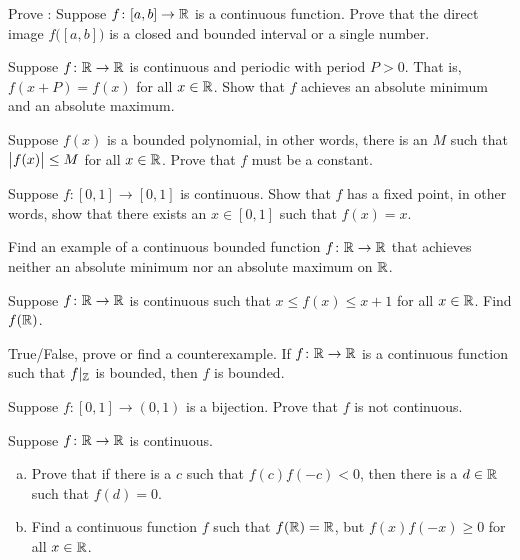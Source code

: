 \begin{exercise}
Prove :
Suppose $f \colon [a,b] \to {\mathbb{R}}$ is a continuous function.  Prove
that the direct image $f\bigl([a,b]\bigr)$ is a closed and bounded interval or
a single number.
\end{exercise}

\begin{exercise}
Suppose $f \colon {\mathbb{R}} \to {\mathbb{R}}$ is continuous and periodic with period
$P > 0$.  That is, $f(x+P) = f(x)$ for all $x \in {\mathbb{R}}$.  Show that $f$
achieves an absolute minimum and an absolute maximum.
\end{exercise}

\begin{exercise}[Challenging]
Suppose $f(x)$ is a bounded polynomial,
in other words, there is an $M$ such that $\bigl\lvert {f(x)} \bigr\rvert \leq M$
for all $x \in {\mathbb{R}}$.  Prove that $f$ must be a constant.
\end{exercise}

\begin{exercise}
Suppose $f \colon [0,1] \to [0,1]$ is continuous.  Show that $f$
has a fixed point, in other words, show that there exists an $x \in [0,1]$ such that
$f(x) = x$.
\end{exercise}

\begin{exercise}
Find an example of a continuous bounded function $f \colon {\mathbb{R}} \to {\mathbb{R}}$ that
achieves neither an absolute minimum nor an absolute maximum on ${\mathbb{R}}$.
\end{exercise}

\begin{exercise}
Suppose $f \colon {\mathbb{R}} \to {\mathbb{R}}$ is continuous such that
$x \leq f(x) \leq x+1$ for all $x \in {\mathbb{R}}$.  Find $f({\mathbb{R}})$.
\end{exercise}

\begin{exercise}
True/False, prove or find a counterexample.  If $f \colon {\mathbb{R}} \to
{\mathbb{R}}$ is a continuous function such that $f|_{{\mathbb{Z}}}$ is bounded, then $f$
is bounded.
\end{exercise}

\begin{exercise}
Suppose $f \colon [0,1] \to (0,1)$ is a bijection.  Prove that $f$ is not
continuous.
\end{exercise}

\begin{exercise}
Suppose $f \colon {\mathbb{R}} \to {\mathbb{R}}$ is continuous.
\begin{enumerate}[a)]
\item
Prove that if there is a $c$ such that $f(c)f(-c) < 0$,
then there is a $d \in {\mathbb{R}}$ such that $f(d) = 0$.
\item
Find a continuous function $f$ such that
$f({\mathbb{R}}) = {\mathbb{R}}$, but $f(x)f(-x) \geq 0$ for all $x \in {\mathbb{R}}$.
\end{enumerate}
\end{exercise}


